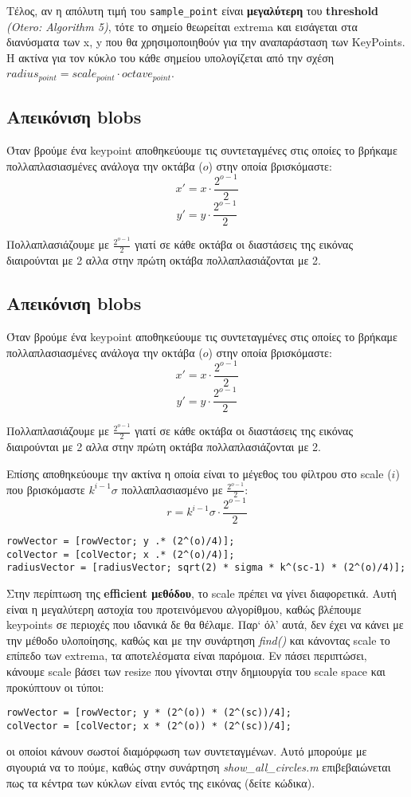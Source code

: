 \documentclass[11pt]{scrartcl} %
\begin{document}
Τέλος, αν η απόλυτη τιμή του \texttt{sample\_point} είναι \textbf{μεγαλύτερη} του \textbf{threshold} \textit{(Otero: Algorithm 5)}\cite{otero},
τότε το σημείο θεωρείται extrema και εισάγεται στα διανύσματα των x, y που θα χρησιμοποιηθούν για την αναπαράσταση των KeyPoints.
Η ακτίνα για τον κύκλο του κάθε σημείου υπολογίζεται από την σχέση $radius_{point} = scale_{point}\cdot octave_{point}$.
\subsection{Απεικόνιση blobs}

Όταν βρούμε ένα keypoint αποθηκεύουμε τις συντεταγμένες στις οποίες το βρήκαμε πολλαπλασιασμένες ανάλογα την οκτάβα ($ο$) στην οποία βρισκόμαστε:
\[x' = x \cdot \frac{2^{o-1}}{2}\]
\[y' = y \cdot \frac{2^{o-1}}{2}\]

Πολλαπλασιάζουμε με $\frac{2^{o-1}}{2}$ γιατί σε κάθε οκτάβα οι διαστάσεις της εικόνας διαιρούνται με 2 αλλα στην πρώτη οκτάβα πολλαπλασιάζονται με 2.
\subsection{Απεικόνιση blobs}

Όταν βρούμε ένα keypoint αποθηκεύουμε τις συντεταγμένες στις οποίες το βρήκαμε πολλαπλασιασμένες ανάλογα την οκτάβα ($ο$) στην οποία βρισκόμαστε:
\[x' = x \cdot \frac{2^{o-1}}{2}\]
\[y' = y \cdot \frac{2^{o-1}}{2}\]

Πολλαπλασιάζουμε με $\frac{2^{o-1}}{2}$ γιατί σε κάθε οκτάβα οι διαστάσεις της εικόνας διαιρούνται με 2 αλλα στην πρώτη οκτάβα πολλαπλασιάζονται με 2.

Επίσης αποθηκεύουμε την ακτίνα η οποία είναι το μέγεθος του φίλτρου στο scale ($i$) που βρισκόμαστε $k^{i-1} \sigma$
πολλαπλασιασμένο με $\frac{2^{o-1}}{2}$:
\[r = k^{i-1} \sigma \cdot \frac{2^{o-1}}{2}\]

\begin{verbatim}
rowVector = [rowVector; y .* (2^(o)/4)];
colVector = [colVector; x .* (2^(o)/4)];
radiusVector = [radiusVector; sqrt(2) * sigma * k^(sc-1) * (2^(o)/4)];
\end{verbatim}

Στην περίπτωση της \textbf{efficient μεθόδου}, το scale πρέπει να γίνει διαφορετικά.
Αυτή είναι η μεγαλύτερη αστοχία του προτεινόμενου αλγορίθμου, καθώς βλέπουμε keypoints
σε περιοχές που ιδανικά δε θα θέλαμε. Παρ` όλ' αυτά, δεν έχει να κάνει με την μέθοδο υλοποίησης,
καθώς και με την συνάρτηση \textit{find()} και κάνοντας scale το επίπεδο των extrema, τα αποτελέσματα
είναι παρόμοια. Εν πάσει περιπτώσει, κάνουμε scale βάσει των resize που γίνονται στην δημιουργία του
scale space και προκύπτουν οι τύποι:
\begin{verbatim}
rowVector = [rowVector; y * (2^(o)) * (2^(sc))/4];
colVector = [colVector; x * (2^(o)) * (2^(sc))/4];
\end{verbatim}
οι οποίοι κάνουν σωστοί διαμόρφωση των συντεταγμένων. Αυτό μπορούμε με σιγουριά να το πούμε, καθώς
στην συνάρτηση \textit{show\_all\_circles.m} επιβεβαιώνεται πως τα κέντρα των κύκλων είναι εντός της
εικόνας (δείτε κώδικα).
\end{document}
